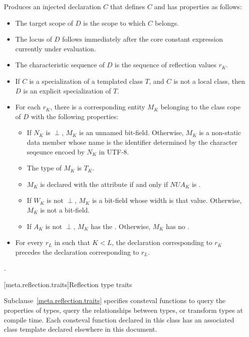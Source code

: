 \begin{itemdescr}
\pnum
\effects
Produces an injected declaration $C$
that defines $C$ and has properties as follows:
\begin{itemize}
\item
  The target scope of $D$
  is the scope to which $C$ belongs.
\item
  The locus of $D$
  follows immediately after the core constant expression
  currently under evaluation.
\item
  The characteristic sequence of $D$
  is the sequence of reflection values $r_K$.
\item
  If $C$ is a specialization of a templated class $T$,
  and $C$ is not a local class,
  then $D$ is an explicit specialization of $T$.
\item
  For each $r_K$,
  there is a corresponding entity $M_K$
  belonging to the class cope of $D$
  with the following properties:
  \begin{itemize}
  \item
    If $N_K$ is $\perp$,
    $M_K$ is an unnamed bit-field.
    Otherwise, $M_K$ is a non-static data member whose name is the identifier
    determined by the character seqeunce encoed by $N_K$ in UTF-8.
  \item
    The type of $M_K$ is $T_K$.
  \item
    $M_K$ is declared with the attribute 
    if and only if $\mathit{NUA}_K$ is .
  \item
    If $W_K$ is not $\perp$,
    $M_K$ is a bit-field whose width is that value.
    Otherwise, $M_K$ is not a bit-field.
  \item
    If $A_K$ is not $\perp$,
    $M_K$ has the  .
    Otherwise, $M_K$ has no .
  \end{itemize}
  \item
    For every $r_L$ in  such that $K < L$,
    the declaration corresponding to $r_K$
    precedes the declaration corresponding to $r_L$.
\end{itemize}

\pnum
\returns
{}.
\end{itemdescr}

[meta.reflection.traits]{Reflection type traits}

\pnum
Subclause~\ref{meta.reflection.traits} specifies consteval functions to
query the properties of types,
query the relationships between types, or
transform types
at compile time.
Each consteval function declared in this class
has an associated class template declared elsewhere in this document.


